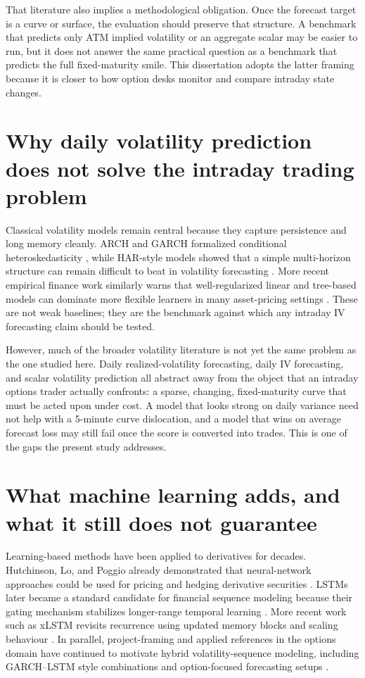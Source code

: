 \documentclass[12pt]{report}
\begin{document}
That literature also implies a methodological obligation. Once the forecast target is a curve or surface, the evaluation should preserve that structure. A benchmark that predicts only ATM implied volatility or an aggregate scalar may be easier to run, but it does not answer the same practical question as a benchmark that predicts the full fixed-maturity smile. This dissertation adopts the latter framing because it is closer to how option desks monitor and compare intraday state changes.

\section{Why daily volatility prediction does not solve the intraday trading problem}
Classical volatility models remain central because they capture persistence and long memory cleanly. ARCH and GARCH formalized conditional heteroskedasticity \citep{engle1982,bollerslev1986}, while HAR-style models showed that a simple multi-horizon structure can remain difficult to beat in volatility forecasting \citep{corsi2009}. More recent empirical finance work similarly warns that well-regularized linear and tree-based models can dominate more flexible learners in many asset-pricing settings \citep{gu2020,heaton2017}. These are not weak baselines; they are the benchmark against which any intraday IV forecasting claim should be tested.

However, much of the broader volatility literature is not yet the same problem as the one studied here. Daily realized-volatility forecasting, daily IV forecasting, and scalar volatility prediction all abstract away from the object that an intraday options trader actually confronts: a sparse, changing, fixed-maturity curve that must be acted upon under cost. A model that looks strong on daily variance need not help with a 5-minute curve dislocation, and a model that wins on average forecast loss may still fail once the score is converted into trades. This is one of the gaps the present study addresses.

\section{What machine learning adds, and what it still does not guarantee}
Learning-based methods have been applied to derivatives for decades. Hutchinson, Lo, and Poggio already demonstrated that neural-network approaches could be used for pricing and hedging derivative securities \citep{hutchinson1994}. LSTMs later became a standard candidate for financial sequence modeling because their gating mechanism stabilizes longer-range temporal learning \citep{hochreiter1997,fischer2018}. More recent work such as xLSTM revisits recurrence using updated memory blocks and scaling behaviour \citep{beck2024xlstm}. In parallel, project-framing and applied references in the options domain have continued to motivate hybrid volatility-sequence modeling, including GARCH--LSTM style combinations and option-focused forecasting setups \citep{hull2019framing,sullivan2019lstm,zhao2024garchlstm}.
\end{document}
